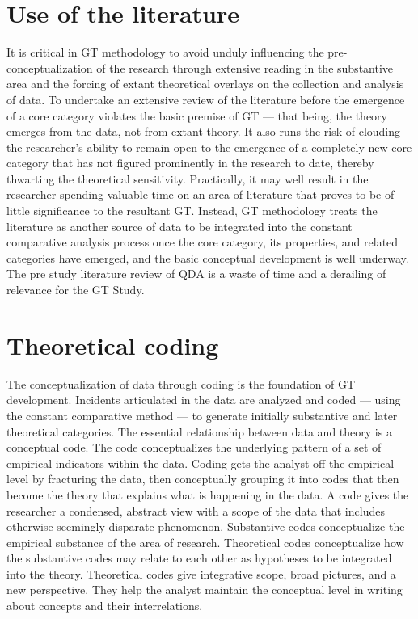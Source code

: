 \section*{Use of the literature}

It is critical in GT methodology to avoid unduly influencing the pre-conceptualization of the research through extensive reading in the substantive area and the forcing of extant theoretical overlays on the collection and analysis of data. 
To undertake an extensive review of the literature before the emergence of a core category violates the basic premise of GT --- that being, the theory emerges from the data, not from extant theory. 
It also runs the risk of clouding the researcher’s ability to remain open to the emergence of a completely new core category that has not figured prominently in the research to date, thereby thwarting the theoretical sensitivity. 
Practically, it may well result in the researcher spending valuable time on an area of literature that proves to be of
little significance to the resultant GT. 
Instead, GT methodology treats the literature as another source of data to be integrated into the constant comparative analysis process once the core category, its properties, and related categories have emerged, and the basic conceptual development is well underway. 
The pre study literature review of QDA is a waste of time and a
derailing of relevance for the GT Study.

\section*{Theoretical coding}

The conceptualization of data through coding is the foundation of GT development. 
Incidents articulated in the data are analyzed and coded --- using the constant comparative method --- to generate initially substantive and later theoretical categories. 
The essential relationship between data and theory is a conceptual code. The code conceptualizes the underlying pattern of a set of empirical indicators within the data. 
Coding gets the analyst off the empirical level by fracturing the data, then conceptually grouping it into codes that then become the theory that explains what is happening in the data. 
A code gives the researcher a condensed, abstract view with a scope of the data that includes otherwise seemingly disparate phenomenon. 
Substantive codes conceptualize the empirical substance of the area of research. 
Theoretical codes conceptualize how the substantive codes may relate to each other as hypotheses to be integrated into the theory. 
Theoretical codes give integrative scope, broad pictures, and a new perspective. 
They help the analyst maintain the conceptual level in writing about concepts and their interrelations.

